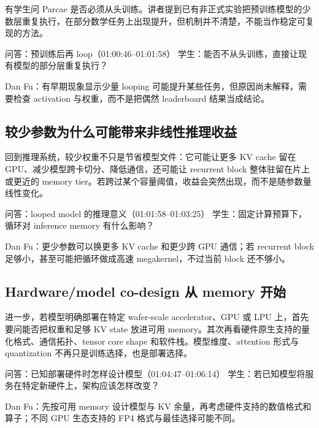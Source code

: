\documentclass[a4paper]{article}
\begin{document}
有学生问 Parcae 是否必须从头训练。讲者提到已有非正式实验把预训练模型的少数层重复执行，在部分数学任务上出现提升，但机制并不清楚，不能当作稳定可复现的方法。

\begin{dialoguebox}{问答：预训练后再 loop（01:00:46--01:01:58）}
学生：能否不从头训练，直接让现有模型的部分层重复执行？\par
Dan Fu：有早期现象显示少量 looping 可能提升某些任务，但原因尚未解释，需要检查 activation 与权重，而不是把偶然 leaderboard 结果当成结论。
\end{dialoguebox}

\subsection{较少参数为什么可能带来非线性推理收益}

回到推理系统，较少权重不只是节省模型文件：它可能让更多 KV cache 留在 GPU、减少模型跨卡切分、降低通信，还可能让 recurrent block 整体驻留在片上或更近的 memory tier。若跨过某个容量阈值，收益会突然出现，而不是随参数量线性变化。

\begin{dialoguebox}{问答：looped model 的推理意义（01:01:58--01:03:25）}
学生：固定计算预算下，循环对 inference memory 有什么影响？\par
Dan Fu：更少参数可以换更多 KV cache 和更少跨 GPU 通信；若 recurrent block 足够小，甚至可能把循环做成高速 megakernel，不过当前 block 还不够小。
\end{dialoguebox}

\subsection{Hardware/model co-design 从 memory 开始}

进一步，若模型明确部署在特定 wafer-scale accelerator、GPU 或 LPU 上，首先要问能否把权重和足够 KV state 放进可用 memory。其次再看硬件原生支持的量化格式、通信拓扑、tensor core shape 和软件栈。模型维度、attention 形式与 quantization 不再只是训练选择，也是部署选择。

\begin{dialoguebox}{问答：已知部署硬件时怎样设计模型（01:04:47--01:06:14）}
学生：若已知模型将服务在特定新硬件上，架构应该怎样改变？\par
Dan Fu：先按可用 memory 设计模型与 KV 余量，再考虑硬件支持的数值格式和算子；不同 GPU 生态支持的 FP4 格式与最佳选择可能不同。
\end{dialoguebox}
\end{document}
